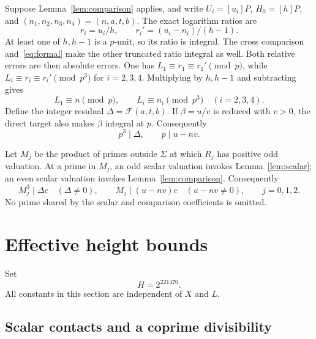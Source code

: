 \documentclass[11pt,a4paper]{article}
\begin{document}
Suppose Lemma~\ref{lem:comparison} applies, and write
$U_i=[u_i]P$, $H_0=[h]P$, and
$(n_1,n_2,n_3,n_4)=(n,a,t,b)$. The exact logarithm ratios are
\[
             r_i=u_i/h,\qquad r_i'=(u_i-n_i)/(h-1).
\]
At least one of $h,h-1$ is a $p$-unit, so its ratio is integral.
The cross comparison and~\eqref{eq:formal} make the other truncated
ratio integral as well. Both relative errors are then absolute
errors. One has $L_1\equiv r_1\equiv r_1'\pmod p$, while
$L_i\equiv r_i\equiv r_i'\pmod{p^3}$ for $i=2,3,4$.
Multiplying by $h,h-1$ and subtracting gives
\[
       L_1\equiv n\pmod p,\qquad
       L_i\equiv n_i\pmod{p^3}\quad(i=2,3,4).
\]
Define the integer residual $\Delta=\mathcal F(a,t,b)$. If
$\beta=u/v$ is reduced with $v>0$, the direct target also makes
$\beta$ integral at $p$. Consequently
\[
                         p^3\mid\Delta,\qquad p\mid u-nv.
\]

Let $M_j$ be the product of primes outside $\Sigma$ at which $R_j$
has positive odd valuation. At a prime in $M_j$, an odd scalar
valuation invokes Lemma~\ref{lem:scalar}; an even scalar valuation
invokes Lemma~\ref{lem:comparison}. Consequently
\begin{equation}\label{eq:divisibility}
        M_j^3\mid\Delta c\quad(\Delta\ne0),\qquad
        M_j\mid(u-nv)c\quad(u-nv\ne0),\qquad j=0,1,2.
\end{equation}
No prime shared by the scalar and comparison coefficients is omitted.

\section{Effective height bounds}\label{sec:heights}

Set
\begin{equation}\label{eq:Hbar}
                         \overline H=2^{221470}.
\end{equation}
All constants in this section are independent of $X$ and $L$.

\subsection{Scalar contacts and a coprime divisibility}
\end{document}
